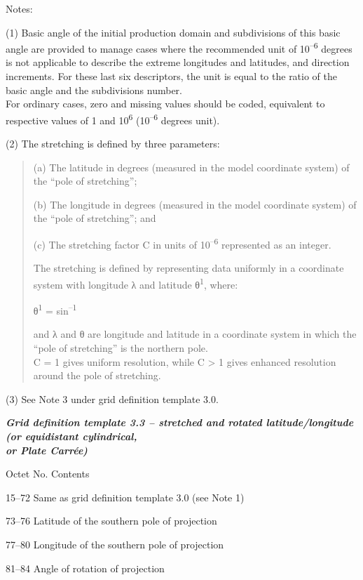 Notes:

(1) Basic angle of the initial production domain and subdivisions of this basic angle are provided to manage cases where the recommended unit of 10\textsuperscript{--6} degrees is not applicable to describe the extreme longitudes and latitudes, and direction increments. For these last six descriptors, the unit is equal to the ratio of the basic angle and the subdivisions number.\\
For ordinary cases, zero and missing values should be coded, equivalent to respective values of 1 and 10\textsuperscript{6} (10\textsuperscript{--6} degrees unit).

(2) The stretching is defined by three parameters:

\begin{quote}
(a) The latitude in degrees (measured in the model coordinate system) of the ``pole of stretching'';

(b) The longitude in degrees (measured in the model coordinate system) of the ``pole of stretching''; and

(c) The stretching factor C in units of 10\textsuperscript{--6} represented as an integer.

The stretching is defined by representing data uniformly in a coordinate system with longitude λ and latitude θ\textsuperscript{1}, where:

θ\textsuperscript{1} = sin\textsuperscript{--1}

and λ and θ are longitude and latitude in a coordinate system in which the ``pole of stretching'' is the northern pole.\\
C = 1 gives uniform resolution, while C \textgreater{} 1 gives enhanced resolution around the pole of stretching.
\end{quote}

(3) See Note 3 under grid definition template 3.0. \emph{\textbf{\\
}}

\emph{\textbf{Grid definition template 3.3 -- stretched and rotated latitude/longitude (or equidistant cylindrical,\\
or Plate Carrée)}}

Octet No. Contents

15--72 Same as grid definition template 3.0 (see Note 1)

73--76 Latitude of the southern pole of projection

77--80 Longitude of the southern pole of projection

81--84 Angle of rotation of projection

